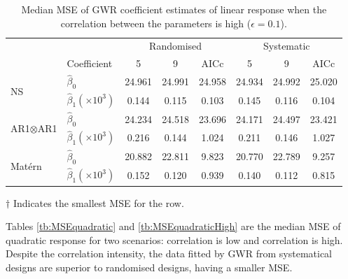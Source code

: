 \documentclass[a4paper]{article} 	%
\newcommand{\Matern}{Mat\'ern }
\begin{document}
\begin{table}[H]
	\centering
\begin{threeparttable}
	\caption{Median MSE of GWR coefficient estimates of linear response when the correlation between the parameters is high ($\epsilon=0.1$).}\label{tb:MSElinearHigh}
	\begin{tabular}{llcccccc}
		\toprule
		&  & \multicolumn{3}{c}{Randomised} & \multicolumn{3}{c}{Systematic} \\ 
		& Coefficient & 5  &  9  & AICc & 5   & 9  & AICc \\ \midrule
		\multirow{2}{*}{NS}   & $\hat{\beta}_0$  & 24.961	&24.991	&24.958	&24.934\tnote{$\dagger$}	&24.992	&25.020 \\
		& $\hat{\beta}_1 (\times 10^3)$ & 0.144&	0.115&	0.103\tnote{$\dagger$} &	0.145&	0.116&	0.104 \\ \midrule
		\multirow{2}{*}{AR1$\otimes$AR1}  & $\hat{\beta}_0$  & 24.234&	24.518&	23.696&	24.171	&24.497&	23.421\tnote{$\dagger$}  \\
		& $\hat{\beta}_1 (\times 10^3)$   & 0.216	&0.144\tnote{$\dagger$} &	1.024&	0.211&	0.146&	1.027 \\ \midrule
		\multirow{2}{*}{\Matern} & $\hat{\beta}_0$  & 20.882&	22.811&	9.823&	20.770	&22.789	&9.257\tnote{$\dagger$}  \\
		& $\hat{\beta}_1 (\times 10^3)$  & 0.152&	0.120&	0.939&	0.140&	0.112\tnote{$\dagger$} &	0.815 \\ 
		\bottomrule
	\end{tabular}
		\begin{tablenotes}
	\item[$\dagger$] \footnotesize Indicates the smallest MSE for the row.
	\end{tablenotes}
\end{threeparttable}
\end{table}

\vspace{12pt}

Tables \ref{tb:MSEquadratic} and \ref{tb:MSEquadraticHigh} are the median MSE of quadratic response for two scenarios: correlation is low and correlation is high. Despite the correlation intensity, the data fitted by GWR from systematical designs are superior to randomised designs, having a smaller MSE. 
\end{document}
